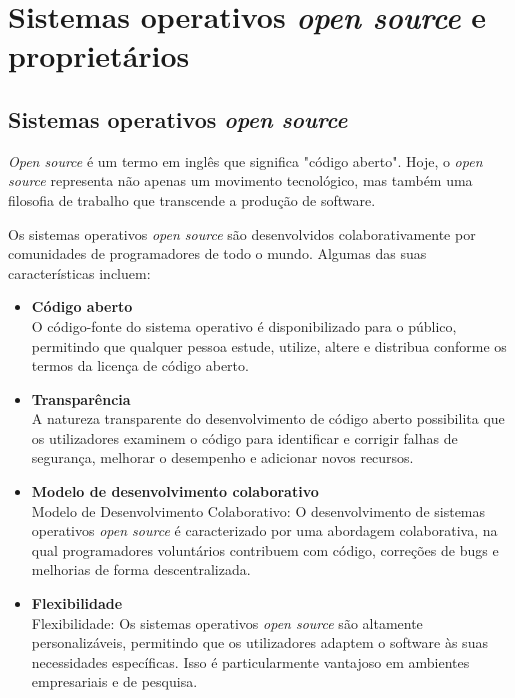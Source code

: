 \section{Sistemas operativos \textit{open source} e proprietários} \label{section: sistemas operativos}
\subsection{Sistemas operativos \textit{open source} }
\textit{Open source} é um termo em inglês que significa "código aberto". Hoje, o \textit{open source} representa não apenas um movimento tecnológico, mas também uma filosofia de trabalho que transcende a produção de software. \cite{whatIsOpenSource}
\par \vspace{6pt}
Os sistemas operativos \textit{open source} são desenvolvidos colaborativamente por comunidades de programadores de todo o mundo. Algumas das suas características incluem: \cite{advantagesOfOpenSource}

\begin{itemize}

  \item \textbf{Código aberto}\\
  O código-fonte do sistema operativo é disponibilizado para o público, permitindo que qualquer pessoa estude, utilize, altere e distribua conforme os termos da licença de código aberto.

  \item \textbf{Transparência}\\
   A natureza transparente do desenvolvimento de código aberto possibilita que os utilizadores examinem o código para identificar e corrigir falhas de segurança, melhorar o desempenho e adicionar novos recursos.

  \item \textbf{Modelo de desenvolvimento colaborativo}\\
  Modelo de Desenvolvimento Colaborativo: O desenvolvimento de sistemas operativos \textit{open source} é caracterizado por uma abordagem colaborativa, na qual programadores voluntários contribuem com código, correções de bugs e melhorias de forma descentralizada.

  \item \textbf{Flexibilidade}\\
  Flexibilidade: Os sistemas operativos \textit{open source} são altamente personalizáveis, permitindo que os utilizadores adaptem o software às suas necessidades específicas. Isso é particularmente vantajoso em ambientes empresariais e de pesquisa.
\end{itemize}


